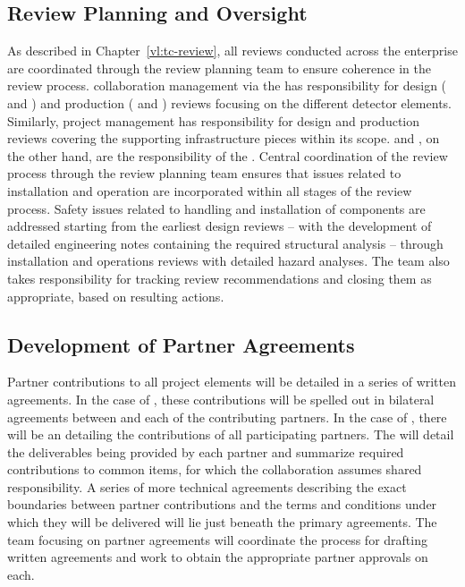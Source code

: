 \subsection{Review Planning and Oversight}
\label{sec:dune_review}

As described in Chapter~\ref{vl:tc-review}, all reviews conducted 
across the  enterprise are coordinated through 
the  review planning team to ensure coherence in the 
review process.   collaboration management via the 
 has responsibility for design ( and 
) and production ( and ) 
reviews focusing on the different detector elements.  Similarly, 
 project management has responsibility for design 
and production reviews covering the supporting infrastructure 
pieces within its scope.   and , on the 
other hand, are the responsibility of the .  Central 
coordination of the review process through the  review 
planning team ensures that issues related to installation and 
operation are incorporated within all stages of the review process.  
Safety issues related to handling and installation of components 
are addressed starting from the earliest design reviews -- with the 
development of detailed engineering notes containing the required 
structural analysis -- through installation and operations reviews 
with detailed hazard analyses.  The  team also takes 
responsibility for tracking review recommendations and closing 
them as appropriate, based on resulting actions.

\subsection{Development of Partner Agreements}
\label{sec:dune_agreements}

Partner contributions to all project elements will be detailed 
in a series of written agreements.  In the case of , 
these contributions will be spelled out in bilateral agreements 
between  and each of the contributing partners.  In 
the case of , there will be an  
detailing the contributions of all participating partners.  The 
 will detail the deliverables being provided by each 
partner and summarize required contributions to common items, 
for which the collaboration assumes shared responsibility.  
A series of more technical agreements describing the exact 
boundaries between partner contributions and the terms and 
conditions under which they will be delivered will lie just 
beneath the primary agreements.  The  team focusing 
on partner agreements will coordinate the process for drafting 
written agreements and work to obtain the appropriate partner 
approvals on each.  

